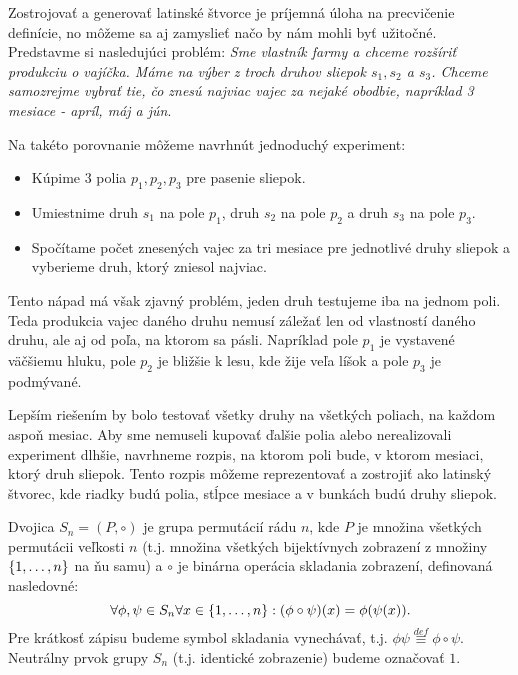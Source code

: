 \begin{example}
Zostrojovať a generovať latinské štvorce je príjemná úloha na precvičenie definície, no môžeme sa aj zamyslieť načo by nám mohli byť užitočné. Predstavme si nasledujúci problém: \textit{Sme vlastník farmy a chceme rozšíriť produkciu o vajíčka. Máme na výber z troch druhov sliepok $s_1, s_2$ a $s_3$. Chceme samozrejme vybrať tie, čo znesú najviac vajec za nejaké obodbie, napríklad 3 mesiace - apríl, máj a jún}.

Na takéto porovnanie môžeme navrhnút jednoduchý experiment:
\begin{itemize}
    \item Kúpime $3$ polia $p_1, p_2, p_3$ pre pasenie sliepok.
    \item Umiestnime druh $s_1$ na pole $p_1$, druh $s_2$ na pole $p_2$ a druh $s_3$ na pole $p_3$.
    \item Spočítame počet znesených vajec za tri mesiace pre jednotlivé druhy sliepok a vyberieme druh, ktorý zniesol najviac.
\end{itemize}

Tento nápad má však zjavný problém, jeden druh testujeme iba na jednom poli. Teda produkcia vajec daného druhu nemusí záležať len od vlastností daného druhu, ale aj od poľa, na ktorom sa pásli. Napríklad pole $p_1$ je vystavené väčšiemu hluku, pole $p_2$ je bližšie k lesu, kde žije veľa líšok a pole $p_3$ je podmývané.

Lepším riešením by bolo testovať všetky druhy na všetkých poliach, na každom aspoň mesiac. Aby sme nemuseli kupovať ďalšie polia alebo nerealizovali experiment dlhšie, navrhneme rozpis, na ktorom poli bude, v ktorom mesiaci, ktorý druh sliepok. Tento rozpis môžeme reprezentovať a zostrojiť ako latinský štvorec, kde riadky budú polia, stĺpce mesiace a v bunkách budú druhy sliepok.

\end{example}

\begin{definition}
Dvojica $S_n = (P, \circ)$ je grupa permutácií rádu $n$, kde $P$ je množina všetkých permutácii veľkosti $n$ (t.j. množina všetkých bijektívnych zobrazení z množiny $\left\{1, \ldots, n\right\}$ na ňu samu) a $\circ$ je binárna operácia skladania zobrazení, definovaná nasledovné: $$\forall\phi,\psi\in S_n  \forall x \in \left\{1, \ldots, n\right\}: (\phi \circ \psi)(x) = \phi(\psi(x)).$$ 
Pre krátkosť zápisu budeme symbol skladania vynechávať, t.j. $\phi \psi \overset{def}{\equiv} \phi \circ \psi$. 
Neutrálny prvok grupy $S_n$ (t.j. identické zobrazenie) budeme označovať $1$.
\end{definition}

